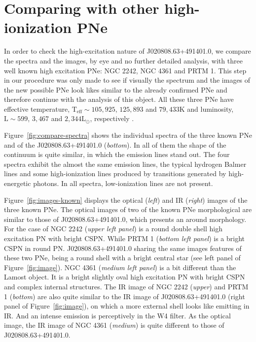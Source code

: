 \documentclass[fleqn,usenatbib]{mnras}
\begin{document}
\section{Comparing with other high-ionization PNe}
\label{sec:comp}

In order to check the high-excitation nature of J020808.63+491401.0,
we compare the spectra and the images, by eye and no further
detailed analysis, with three well known high excitation PNe: NGC 2242,
NGC 4361 and PRTM 1. This step in our procedure was only made
to see if visually the spectrum and the images of the new possible PNe
look likes similar to the already confirmed PNe and therefore continue with
the analysis of this object. All these three PNe have effective temperature,
$\mathrm{T_{eff} \sim 105,925}$, $125,893$ and $79,433$K
and luminosity, $\mathrm{L \sim 599}$, $3,467$ and $2,344$L$_{\odot}$,
respectively \citep{Weidmann:2020}.

Figure~\ref{fig:compare-spectra} shows the individual spectra of the three known PNe
and of the J020808.63+491401.0 (\textit{bottom}). In all of them the shape of
the continuum is quite similar, in which the emission lines stand out.
The four spectra exhibit the almost the same emission lines, the typical hydrogen
Balmer lines and some high-ionization lines produced by transitions generated
by high-energetic photons. In all spectra, low-ionization lines are not present.

Figure~\ref{fig:images-known} displays the optical (\textit{left}) and IR (\textit{right})
images of the three known PNe. The optical images of two of the known
PNe morphological are similar to those of J020808.63+491401.0, which presents
an around morphology. For the case of NGC 2242 (\textit{upper left panel}) is a
round double shell high excitation PN with bright CSPN. While  PRTM 1
(\textit{bottom left panel}) is a bright CSPN in round PN. J020808.63+491401.0
sharing the same images features of these two PNe, being a round shell with a bright central star
(see left panel of Figure~\ref{fig:image}). NGC 4361 (\textit{medium left panel}) is a
bit different than the Lamost object. It is a bright slightly oval high excitation PN
with bright CSPN and complex internal structures. The IR image of NGC 2242 (\textit{upper})
and PRTM 1 (\textit{bottom}) are also quite similar to the IR image  of J020808.63+491401.0
(right panel of Figure~\ref{fig:image}), on which a more external shell looks like
emitting in IR. And an intense emission is perceptively in the W4 filter. As the optical
image, the IR image of NGC 4361 (\textit{medium}) is quite different to those
of J020808.63+491401.0.
\end{document}
